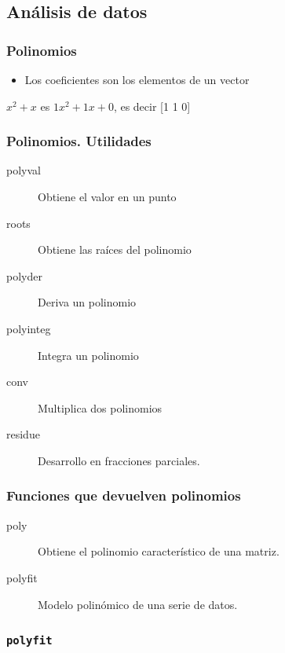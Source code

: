 \documentclass[12pt]{beamer}
\begin{document}
\subsection{Análisis de datos}



\begin{frame}
\frametitle{Polinomios}
\begin{itemize}
\item Los coeficientes son los elementos de un vector
\end{itemize}
$x^2 + x$ es $1x^2+1x+0$, es decir [1 1 0]
\testcode
\end{frame}

\begin{frame}
\frametitle{Polinomios. Utilidades}
\begin{description}
\item[polyval] Obtiene el valor en un punto
\item[roots] Obtiene las raíces del polinomio
\item[polyder] Deriva un polinomio
\item[polyinteg] Integra un polinomio
\item[conv] Multiplica dos polinomios
\item[residue] Desarrollo en fracciones parciales.
\end{description}
\end{frame}

\begin{frame}
\frametitle{Funciones que devuelven polinomios}
\begin{description}
\item[poly] Obtiene el polinomio característico de una matriz.
\item[polyfit] Modelo polinómico de una serie de datos.
\end{description}
\end{frame}


\begin{frame}
\frametitle{\texttt{polyfit}}
\testcode
\end{frame}
\end{document}
